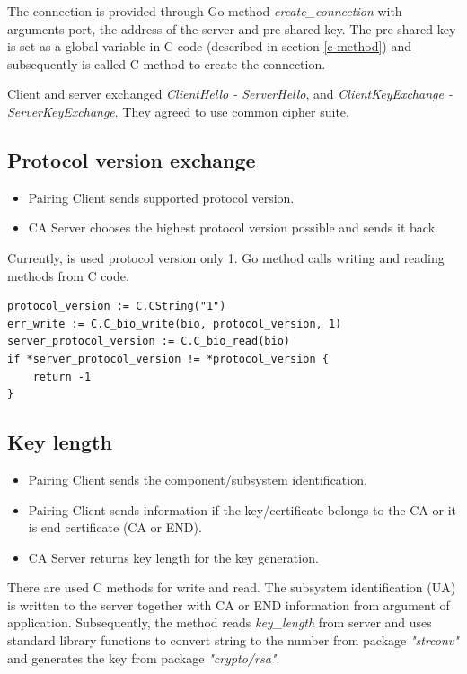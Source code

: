 \documentclass[
  digital, %
  notable,   %
  lof,     %
  lot,     %
]{fithesis3}
\begin{document}
The connection is provided through Go method \textit{create\_connection} with arguments port, the 
address of the server and pre-shared key. The pre-shared key is set as a global variable in C code 
(described in section \ref{c-method}) and subsequently is called C method to create the connection. 

Client and server exchanged \textit{ClientHello - ServerHello}, and \textit{ClientKeyExchange - 
ServerKeyExchange}. They agreed to use common cipher suite. 

\subsection{Protocol version exchange}
\begin{itemize}[leftmargin=2em,rightmargin=1em,itemsep=0.75\parskip,parsep=0em,topsep=0em,partopsep=0em]
\item Pairing Client sends supported protocol version.
\item CA Server chooses the highest protocol version possible and sends it back.
\end{itemize}

Currently, is used protocol version only 1. Go method calls writing and reading methods from C 
code.

\begin{lstlisting}
protocol_version := C.CString("1")
err_write := C.C_bio_write(bio, protocol_version, 1)
server_protocol_version := C.C_bio_read(bio)
if *server_protocol_version != *protocol_version {
	return -1
} 
\end{lstlisting}


\subsection{Key length}
\begin{itemize}[leftmargin=2em,rightmargin=1em,itemsep=0.75\parskip,parsep=0em,topsep=0em,partopsep=0em]
\item Pairing Client sends the component/subsystem identification.
\item Pairing Client sends information if the key/certificate belongs to the CA or it is end certificate (CA or END).
\item CA Server returns key length for the key generation.
\end{itemize}
    
There are used C methods for write and read. The subsystem identification (UA) is written to the server together with CA or END information from argument of application. Subsequently, the method reads \textit{key\_length} from server and uses standard library functions to convert string to the number from package \textit{"strconv"} and generates the key from package \textit{"crypto/rsa"}.
\end{document}
